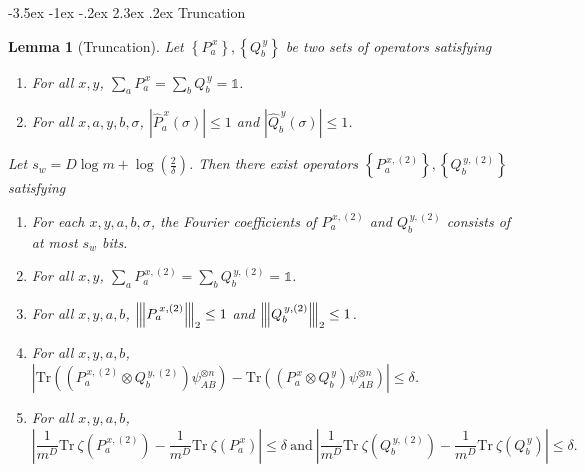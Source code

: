 \documentclass[10pt,a4paper]{article}
\makeatletter
\renewcommand{\section}{\@startsection {section}{1}{\z@}%
             {-3.5ex \@plus -1ex \@minus -.2ex}%
             {2.3ex \@plus .2ex}%
             {\normalfont\Large\scshape\bfseries}}
\theoremstyle{plain}
\newtheorem{lemma}[theorem]{Lemma}
\theoremstyle{definition}
\newcommand {\set} [1] {\ensuremath{ \left\lbrace #1 \right\rbrace }}
\newcommand {\br} [1] {\ensuremath{ \left( #1 \right) }}
\newcommand {\ab} [1] {\ensuremath{ \left| #1 \right| }}
\newcommand{\nnorm}[1]{{\left\vert\kern-0.25ex\left\vert\kern-0.25ex\left\vert #1
		\right\vert\kern-0.25ex\right\vert\kern-0.25ex\right\vert}}
\newcommand {\Tr} {\ensuremath{ \mathrm{Tr} }}
\newcommand {\id} {\ensuremath{\mathds{1}}}
\newcommand{\dlbo} {\ensuremath{{D}}}
\newcommand{\wireal} {\ensuremath{{s_{w}}}}
\newcommand{\Pss} {\ensuremath{P^{\,x}_a}}
\newcommand{\Qss} {\ensuremath{Q^{\,y}_b}}
\newcommand{\Pnn}[1] {\ensuremath{{P^{\,x, (#1)}_a}}}
\newcommand{\Qnn}[1] {\ensuremath{{Q^{\,y, (#1)}_b}}}
\newcommand{\Pff} {\ensuremath{\widehat{P}^{\,x}_a(\sigma)}}
\newcommand{\Qff} {\ensuremath{\widehat{Q}^{\,y}_b(\sigma)}}
\newcommand{\1}{\mathbb{1}} %
\makeatother
\begin{document}
\section{Truncation}
\begin{lemma}[Truncation]\label{lem:truncating_low_degrees}
  Let $\set{\Pss}, \set{\Qss}$ be two sets of operators satisfying
  \begin{enumerate}
    \item For all $x, y$, $\sum_{a}\Pss=\sum_{b}\Qss=\id$.
    \item For all $x, a, y, b, \sigma$, $\ab{\Pff}\le1$ and $\ab{\Qff}\le 1$.
  \end{enumerate}
  Let $\wireal = D\log m + \log\br{\frac{2}{\delta}}$.
  Then there exist operators $\set{\Pnn{2}}, \set{\Qnn{2}}$ satisfying
  \begin{enumerate}
    \item For each $x, y, a, b, \sigma$, the Fourier coefficients of $\Pnn{2}$ and $\Qnn{2}$ consists of at most $\wireal$ bits.
    \item For all $x, y$, $\sum_{a}\Pnn{2}=\sum_{b}\Qnn{2}=\id$.
    \item For all $x, y, a, b$, $\nnorm{\Pnn{2}}_2\le1$ and $\nnorm{\Qnn{2}}_2\le1$.
    \item For all $x, y, a, b$, $\ab{\Tr\br{\br{\Pnn{2}\otimes \Qnn{2}}\psi^{\otimes n}_{AB}}-\Tr\br{\br{\Pss\otimes \Qss}\psi^{\otimes n}_{AB}}}\leq\delta$.
	\item For all $x, y, a, b$, \[\ab{\frac{1}{m^\dlbo}\Tr~\zeta\br{\Pnn{2}}-\frac{1}{m^\dlbo}\Tr~\zeta\br{\Pss}}\leq\delta~\mbox{and}~\ab{\frac{1}{m^\dlbo}\Tr~\zeta\br{\Qnn{2}}-\frac{1}{m^\dlbo}\Tr~\zeta\br{\Qss}}\leq\delta. \]
  \end{enumerate}
\end{lemma}
\end{document}
